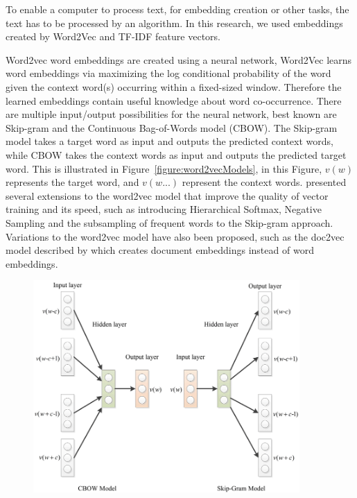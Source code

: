 \documentclass[../../Thesis.tex]{subfiles}
\begin{document}
To enable a computer to process text, for embedding creation or other tasks, the text has to be processed by an algorithm. In this research, we used embeddings created by Word2Vec and TF-IDF feature vectors.
\begin{jumpin}
Word2vec word embeddings are created using a neural network, Word2Vec learns word embeddings via maximizing the log conditional probability of the word given the context word(s) occurring within a fixed-sized window. Therefore the learned embeddings contain useful knowledge about word co-occurrence\cite{nalisnick2016improving}. There are multiple input/output possibilities for the neural network, best known are Skip-gram and the Continuous Bag-of-Words model (CBOW). The Skip-gram model takes a target word as input and outputs the predicted context words, while CBOW takes the context words as input and outputs the predicted target word\cite{nalisnick2016improving, pennington2014glove}. This is illustrated in Figure~\ref{figure:word2vecModels}, in this Figure, $v(w)$ represents the target word, and $v(w...)$ represent the context words. \citet{mikolov2013distributed}\cite{mikolov2013efficient} presented several extensions to the word2vec model that improve the quality of vector training and its speed, such as introducing Hierarchical Softmax, Negative Sampling and the subsampling of frequent words to the Skip-gram approach. Variations to the word2vec model have also been proposed, such as the doc2vec model described by \citet{lau2016empirical} which creates document embeddings instead of word embeddings.
\begin{center}
\begin{figure}[hbt]
\includegraphics[width=4in]{Plots/Model-Architecture-of-CBOW-and-Skip-Gram.png}

\end{figure}
\end{center}
\end{jumpin}
\end{document}
